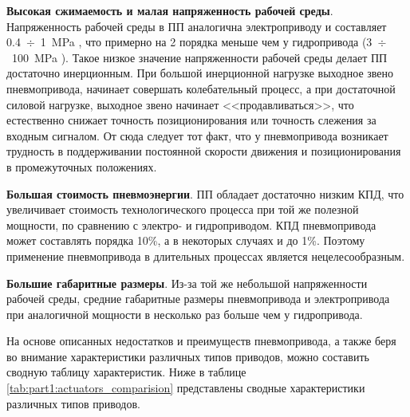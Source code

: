 \textbf{Высокая сжимаемость и малая напряженность рабочей среды}.
Напряженность рабочей среды в ПП аналогична электроприводу и составляет 0.4~$\div$~1~\si{\mega\pascal} \cite{tugengold:a},
что примерно на 2 порядка меньше чем у гидропривода (3~$\div$~100~\si{\mega\pascal} \cite{tugengold:a}).
Такое низкое значение напряженности рабочей среды делает ПП достаточно инерционным.
При большой инерционной нагрузке выходное звено пневмопривода, начинает совершать колебательный процесс, а при
достаточной силовой нагрузке, выходное звено начинает <<продавливаться>>, что естественно снижает точность
позиционирования или точность слежения за входным сигналом. От сюда следует тот факт, что у пневмопривода возникает
трудность в поддерживании постоянной скорости движения и позиционирования в промежуточных положениях.

\textbf{Большая стоимость пневмоэнергии}.
ПП обладает достаточно низким КПД, что увеличивает стоимость технологического процесса при
той же полезной мощности, по сравнению с электро- и гидроприводом. КПД пневмопривода может составлять
порядка 10\%, а в некоторых случаях и до 1\%.
Поэтому применение пневмопривода в длительных процессах является нецелесообразным.

\textbf{Большие габаритные размеры}.
Из-за той же небольшой напряженности рабочей среды, средние габаритные размеры пневмопривода и электропривода
при аналогичной мощности в несколько раз больше чем у гидропривода.

На основе описанных недостатков и преимуществ пневмопривода, а также беря во внимание
характеристики различных типов приводов, можно составить сводную таблицу характеристик.
Ниже в таблице \cref*{tab:part1:actuators_comparision} представлены
сводные характеристики различных типов приводов.

